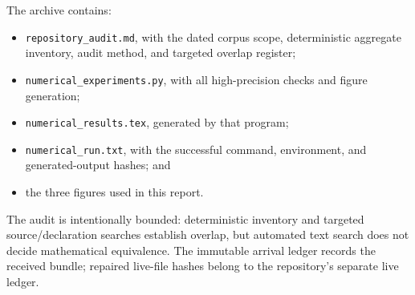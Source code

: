 \documentclass[11pt,oneside]{article}
\theoremstyle{definition}
\theoremstyle{remark}
\begin{document}
The archive contains:
\begin{itemize}[leftmargin=2em]
\item \texttt{repository\_audit.md}, with the dated corpus scope, deterministic
      aggregate inventory, audit method, and targeted overlap register;
\item \texttt{numerical\_experiments.py}, with all high-precision checks and
      figure generation;
\item \texttt{numerical\_results.tex}, generated by that program;
\item \texttt{numerical\_run.txt}, with the successful command, environment,
      and generated-output hashes; and
\item the three figures used in this report.
\end{itemize}
The audit is intentionally bounded: deterministic inventory and targeted
source/declaration searches establish overlap, but automated text search does
not decide mathematical equivalence.  The immutable arrival ledger records
the received bundle; repaired live-file hashes belong to the repository's
separate live ledger.
\end{document}
